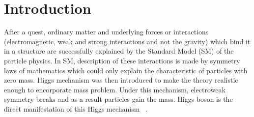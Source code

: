 \chapter{Introduction}
After a quest, ordinary matter and underlying forces or interactions (electromagnetic, weak and strong interactions and not the gravity) which bind it in a structure are successfully explained by the Standard Model (SM) of the particle physics. %
In SM, description of these interactions is made by symmetry laws of mathematics which could only explain the characteristic of particles with zero mass. 
Higgs mechanism was then introduced to make the theory realistic enough to encorporate mass problem. Under this mechanism, electroweak symmetry breaks and as a result particles gain the mass. Higgs boson is the direct manifestation of this Higgs mechanism ~\cite{Reference7,Reference8,Reference9,Reference10,Reference11,Reference12}.

